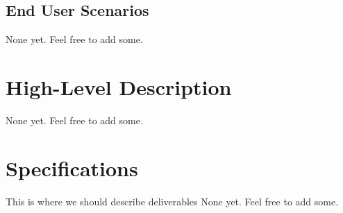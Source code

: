 \documentclass[a4paper,10pt]{article} \usepackage{anysize}
\begin{document}
    \subsection{End User Scenarios}
        None yet. Feel free to add some.

\section{High-Level Description}
    None yet. Feel free to add some.

\section{Specifications}
    This is where we should describe deliverables
    None yet. Feel free to add some.
\end{document}
